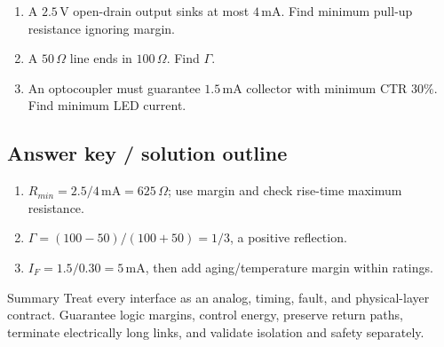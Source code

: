 \documentclass[10pt,letterpaper]{article}
\begin{document}
\begin{enumerate}
  \item A $2.5\,\mathrm{V}$ open-drain output sinks at most $4\,\mathrm{mA}$. Find minimum pull-up resistance ignoring margin.
  \item A $50\,\Omega$ line ends in $100\,\Omega$. Find $\Gamma$.
  \item An optocoupler must guarantee $1.5\,\mathrm{mA}$ collector with minimum CTR $30\%$. Find minimum LED current.
\end{enumerate}\subsection{Answer key / solution outline}
\begin{enumerate}
  \item $R_{min}=2.5/4\,\mathrm{mA}=625\,\Omega$; use margin and check rise-time maximum resistance.
  \item $\Gamma=(100-50)/(100+50)=1/3$, a positive reflection.
  \item $I_F=1.5/0.30=5\,\mathrm{mA}$, then add aging/temperature margin within ratings.
\end{enumerate}\begin{CornellSummaryBox}{Summary}
Treat every interface as an analog, timing, fault, and physical-layer contract. Guarantee logic margins, control energy, preserve return paths, terminate electrically long links, and validate isolation and safety separately.
\end{CornellSummaryBox}
\end{document}
